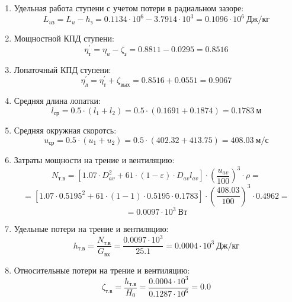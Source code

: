 \documentclass[a4paper,10pt]{article}
\begin{document}
\begin{enumerate}
        \item Удельная работа ступени с учетом потери в радиальном зазоре:
        \[
            L_{uз} = L_u - h_з = 0.1134 \cdot 10^6 -
                3.7914 \cdot 10^3 =
            0.1096 \cdot 10^6 \ Дж/кг
        \]

        \item Мощностной КПД ступени:
        \[
            \eta_т^\prime = \eta_u - \zeta_з =
                0.8811 - 0.0295 = 0.8516
        \]

        \item Лопаточный КПД ступени:
        \[
            \eta_л^\prime = \eta_т^\prime + \zeta_{вых} =
                 0.8516 +  0.0551 =
            0.9067
        \]

        \item Средняя длина лопатки:
        \[
            l_{ср} = 0.5 \cdot (l_1 + l_2) =
                0.5 \cdot (0.1691 + 0.1874) =
            0.1783\ м
        \]

        \item Средняя окружная скоротсь:
        \[
            u_{ср} = 0.5 \cdot (u_1 + u_2) =
                0.5 \cdot (402.32 + 413.75) =
            408.03\ м/с
        \]

        \item Затраты мощности на трение и вентиляцию:
        \[
            N_{т.в} = \left[
                    1.07 \cdot D_{av}^2 + 61 \cdot (1 - \varepsilon) \cdot D_{av} l_{av}
            \right] \cdot
            \left(
                \frac{ u_{av} }{ 100 }
            \right) ^ 3 \cdot
            \rho =
        \]
        \[    = \left[
                1.07 \cdot 0.5195^2 +
                61 \cdot (1 - 1) \cdot
                0.5195 \cdot 0.1783
            \right] \cdot
            \left(
                \frac{ 408.03 }{ 100 }
            \right) ^ 3 \cdot
            0.4962=
        \]
        \[
            = 0.0097 \cdot 10^3 \ Вт
        \]

        \item Удельные потери на трение и вентиляцию:
        \[
            h_{т.в} = \frac{ N_{т.в} }{ G_{вх} } =
                \frac{
                    0.0097 \cdot 10^3
                }{
                    25.1
                }
            = 0.0004 \cdot 10^3 \ Дж/кг
        \]

        \item Относительные потери на трение и вентиляцию:
        \[
            \zeta_{т.в} = \frac{ h_{т.в} }{ H_0 } =
                \frac{ 0.0004 \cdot 10^3 }{ 0.1287 \cdot 10^6 } =
            0.0
        \]


\end{enumerate}
\end{document}
